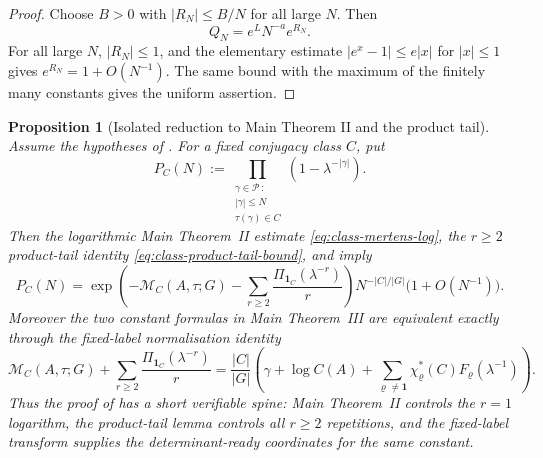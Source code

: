 \documentclass[11pt,a4paper]{amsart}
\theoremstyle{plain}
\newtheorem{proposition}[theorem]{Proposition}
\theoremstyle{definition}
\theoremstyle{remark}
\newcommand{\cP}{\mathcal P}
\begin{document}
\begin{proof}
  Choose \(B>0\) with \(|R_N|\le B/N\) for all large \(N\).  Then
  \[
    Q_N=e^L N^{-a}e^{R_N}.
  \]
  For all large \(N\), \(|R_N|\le1\), and the elementary estimate
  \(|e^x-1|\le e|x|\) for \(|x|\le1\) gives
  \(e^{R_N}=1+O(N^{-1})\).  The same bound with the maximum of the finitely
  many constants gives the uniform assertion.
\end{proof}

\begin{proposition}[Isolated reduction to Main Theorem II and the product tail]
  \label{prop:class-euler-product-main-chain-reduction}
  Assume the hypotheses of .  For a fixed
  conjugacy class \(C\), put
  \[
    P_C(N):=
    \prod_{\substack{\gamma\in\cP\,:\\ |\gamma|\le N\\
      \tau(\gamma)\in C}}
      \left(1-\lambda^{-|\gamma|}\right).
  \]
  Then the logarithmic Main Theorem~II estimate
  \eqref{eq:class-mertens-log}, the \(r\ge2\) product-tail identity
  \eqref{eq:class-product-tail-bound}, and
   imply
  \begin{equation}\label{eq:class-euler-product-reduction-asymptotic}
    P_C(N)=
    \exp\!\left(
      -\mathcal M_C(A,\tau;G)
      -\sum_{r\ge2}\frac{\Pi_{\mathbf1_C}(\lambda^{-r})}{r}
    \right)
    N^{-|C|/|G|}\bigl(1+O(N^{-1})\bigr).
  \end{equation}
  Moreover the two constant formulas in Main Theorem~III are equivalent
  exactly through the fixed-label normalisation identity
  \begin{equation}\label{eq:class-euler-product-reduction-normalisation}
    \mathcal M_C(A,\tau;G)
    +\sum_{r\ge2}\frac{\Pi_{\mathbf1_C}(\lambda^{-r})}{r}
    =
    \frac{|C|}{|G|}
    \left(
      \gamma+
      \log C(A)+
      \sum_{\varrho\ne\mathbf1}
        \chi_\varrho^\ast(C)F_\varrho(\lambda^{-1})
    \right).
  \end{equation}
  Thus the proof of  has a short
  verifiable spine: Main Theorem~II controls the \(r=1\) logarithm, the
  product-tail lemma controls all \(r\ge2\) repetitions, and the fixed-label
  transform supplies the determinant-ready coordinates for the same constant.
\end{proposition}
\end{document}

